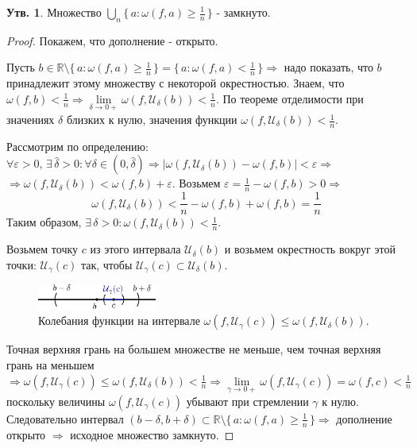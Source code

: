 \documentclass[12pt]{article}
\theoremstyle{definition}
\newtheorem{prop}{Утв.}
\begin{document}
\begin{prop}
	Множество $\bigcup\limits_{n}\{\,a \colon \omega(f,a) \geq \frac{1}{n} \,\}$ - замкнуто.
\end{prop}
\begin{proof}
	Покажем, что дополнение - открыто. 
	
	Пусть $b \in \mathbb{R}\setminus\{\,a \colon \omega(f,a) \geq \frac{1}{n} \,\} = \{\,a \colon \omega(f,a) < \frac{1}{n} \,\} \Rightarrow$ надо показать, что $b$ принадлежит этому множеству с некоторой окрестностью. Знаем, что $\omega(f,b) <\frac{1}{n} \Rightarrow \lim\limits_{\delta \to 0+} \omega(f,\mathcal{U}_\delta(b)) < \frac{1}{n}$. По теореме отделимости при значениях $\delta$ близких к нулю, значения функции $\omega(f,\mathcal{U}_\delta(b)) < \frac{1}{n}$.
	
	Рассмотрим по определению: $\forall \varepsilon > 0, \, \exists \, \hat{\delta} >0 \colon \forall \delta \in (0, \hat{\delta}) \Rightarrow |\omega(f,\mathcal{U}_\delta(b)) - \omega(f,b)| < \varepsilon \Rightarrow$\\ $\Rightarrow \omega(f,\mathcal{U}_\delta(b)) < \omega(f,b) + \varepsilon$. Возьмем $\varepsilon = \frac{1}{n} - \omega(f,b) > 0 \Rightarrow$ 
	$$\omega(f,\mathcal{U}_\delta(b)) < \frac{1}{n} -  \omega(f,b) + \omega(f,b) = \frac{1}{n}$$
	Таким образом, $\exists \, \delta >0 \colon \omega(f,\mathcal{U}_\delta(b)) <  \frac{1}{n}$. 
	
	Возьмем точку $c$ из этого интервала $\mathcal{U}_\delta(b)$ и возьмем окрестность вокруг этой точки: $\mathcal{U}_\gamma (c)$ так, чтобы $\mathcal{U}_\gamma (c) \subset \mathcal{U}_\delta(b)$.
	
	\begin{figure}[H]
		\centering
		\includegraphics[width=0.35\textwidth]{18_1.eps}
		\caption{Колебания функции на интервале $\omega(f,\mathcal{U}_\gamma(c)) \leq \omega(f,\mathcal{U}_\delta(b))$.}
		\label{18_1}
	\end{figure}

	Точная верхняя грань на большем множестве не меньше, чем точная верхняя грань на меньшем $\Rightarrow \omega(f,\mathcal{U}_\gamma(c)) \leq \omega(f,\mathcal{U}_\delta(b)) < \frac{1}{n} \Rightarrow \lim\limits_{\gamma \to 0+} \omega(f,\mathcal{U}_\gamma(c)) = \omega(f,c) < \frac{1}{n}$ поскольку величины $\omega(f,\mathcal{U}_\gamma(c))$ убывают при стремлении $\gamma$ к нулю. Следовательно интервал $(b - \delta, b + \delta) \subset \mathbb{R}\setminus\{\,a \colon \omega(f,a) \geq \frac{1}{n} \,\} \Rightarrow$ дополнение открыто $\Rightarrow$ исходное множество замкнуто.
\end{proof}
\end{document}
